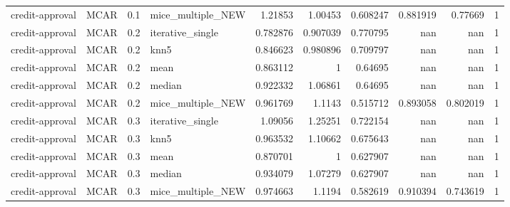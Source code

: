 \begin{table}[ht]
\begin{tabular}{llrlrrrrrr}
 credit-approval & MCAR        &         0.1 & mice\_multiple\_NEW &       1.21853  &             1.00453  &              0.608247  &                         0.881919 &                      0.77669   &         1 \\
 credit-approval & MCAR        &         0.2 & iterative\_single  &       0.782876 &             0.907039 &              0.770795  &                       nan        &                    nan         &         1 \\
 credit-approval & MCAR        &         0.2 & knn5              &       0.846623 &             0.980896 &              0.709797  &                       nan        &                    nan         &         1 \\
 credit-approval & MCAR        &         0.2 & mean              &       0.863112 &             1        &              0.64695   &                       nan        &                    nan         &         1 \\
 credit-approval & MCAR        &         0.2 & median            &       0.922332 &             1.06861  &              0.64695   &                       nan        &                    nan         &         1 \\
 credit-approval & MCAR        &         0.2 & mice\_multiple\_NEW &       0.961769 &             1.1143   &              0.515712  &                         0.893058 &                      0.802019  &         1 \\
 credit-approval & MCAR        &         0.3 & iterative\_single  &       1.09056  &             1.25251  &              0.722154  &                       nan        &                    nan         &         1 \\
 credit-approval & MCAR        &         0.3 & knn5              &       0.963532 &             1.10662  &              0.675643  &                       nan        &                    nan         &         1 \\
 credit-approval & MCAR        &         0.3 & mean              &       0.870701 &             1        &              0.627907  &                       nan        &                    nan         &         1 \\
 credit-approval & MCAR        &         0.3 & median            &       0.934079 &             1.07279  &              0.627907  &                       nan        &                    nan         &         1 \\
 credit-approval & MCAR        &         0.3 & mice\_multiple\_NEW &       0.974663 &             1.1194   &              0.582619  &                         0.910394 &                      0.743619  &         1 \\

\end{tabular}
\end{table}

